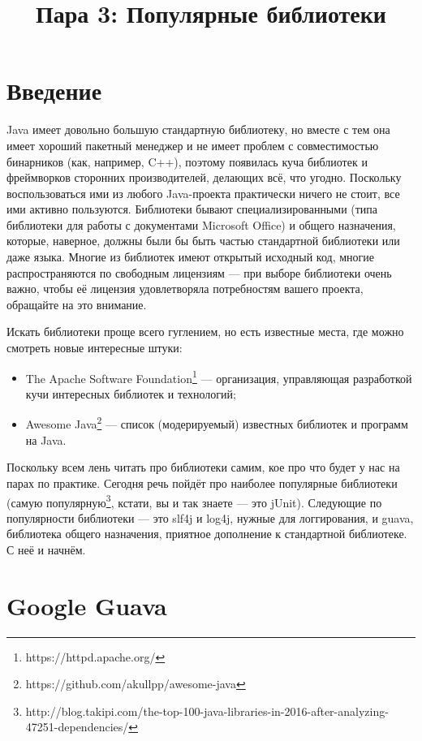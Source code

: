 \documentclass[a5paper,draft]{article}
\title{Пара 3: Популярные библиотеки}
\date{}
\begin{document}
\maketitle
\thispagestyle{empty}

\section{Введение}

Java имеет довольно большую стандартную библиотеку, но вместе с тем она имеет хороший пакетный менеджер и не имеет проблем с совместимостью бинарников (как, например, C++), поэтому появилась куча библиотек и фреймворков сторонних производителей, делающих всё, что угодно. Поскольку воспользоваться ими из любого Java-проекта практически ничего не стоит, все ими активно пользуются. Библиотеки бывают специализированными (типа библиотеки для работы с документами Microsoft Office) и общего назначения, которые, наверное, должны были бы быть частью стандартной библиотеки или даже языка. Многие из библиотек имеют открытый исходный код, многие распространяются по свободным лицензиям --- при выборе библиотеки очень важно, чтобы её лицензия удовлетворяла потребностям вашего проекта, обращайте на это внимание.

Искать библиотеки проще всего гуглением, но есть известные места, где можно смотреть новые интересные штуки: 
\begin{itemize}
	\item The Apache Software Foundation\footnote{https://httpd.apache.org/} --- организация, управляющая разработкой кучи интересных библиотек и технологий;
	\item Awesome Java\footnote{https://github.com/akullpp/awesome-java} --- список (модерируемый) известных библиотек и программ на Java.
\end{itemize}

Поскольку всем лень читать про библиотеки самим, кое про что будет у нас на парах по практике. Сегодня речь пойдёт про наиболее популярные библиотеки (самую популярную\footnote{http://blog.takipi.com/the-top-100-java-libraries-in-2016-after-analyzing-47251-dependencies/}, кстати, вы и так знаете --- это jUnit). Следующие по популярности библиотеки --- это slf4j и log4j, нужные для логгирования, и guava, библиотека общего назначения, приятное дополнение к стандартной библиотеке. С неё и начнём.

\section{Google Guava}
\end{document}
